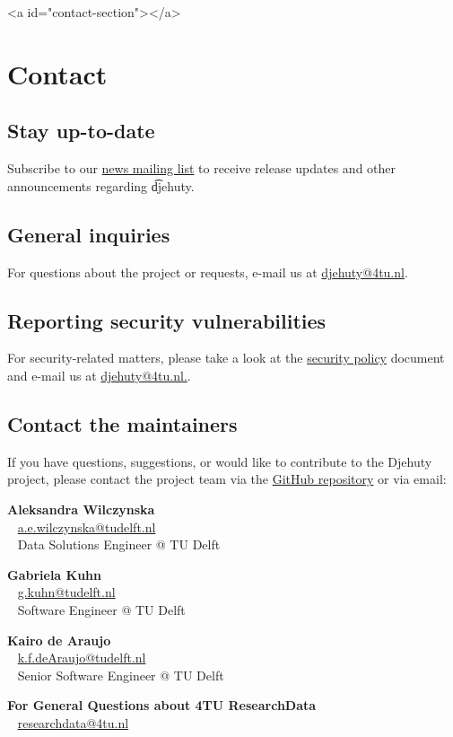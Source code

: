 \ifdefined\HCode
\begin{html}
<a id="contact-section"></a>
\end{html}
\fi
\chapter*{Contact}

\section*{Stay up-to-date}

  Subscribe to our \href{https://djehuty.4tu.nl/postorius/lists/news.djehuty.4tu.nl/}%
  {news mailing list} to receive release updates and other
  announcements regarding \t{djehuty}.

\section*{General inquiries}

  For questions about the project or requests,
  e-mail us at \href{mailto:djehuty@4tu.nl}{djehuty@4tu.nl}.

\section*{Reporting security vulnerabilities}

  For security-related matters, please take a look at the
  \href{https://github.com/4TUResearchData/djehuty?tab=security-ov-file#readme}{security policy}
  document and e-mail us at \href{mailto:djehuty@4tu.nl.}{djehuty@4tu.nl.}.

\section*{Contact the maintainers}

  If you have questions, suggestions, or would like to contribute to the Djehuty project,
  please contact the project team via the
  \href{https://github.com/4TUResearchData/djehuty}{GitHub repository}
  or via email:

\textbf{Aleksandra Wilczynska}\\~
\href{mailto:a.e.wilczynska@tudelft.nl}{a.e.wilczynska@tudelft.nl}\\~
Data Solutions Engineer @ TU Delft

\textbf{Gabriela Kuhn}\\~
\href{mailto:g.kuhn@tudelft.nl}{g.kuhn@tudelft.nl}\\~
Software Engineer @ TU Delft

\textbf{Kairo de Araujo}\\~
\href{mailto:k.f.deAraujo@tudelft.nl}{k.f.deAraujo@tudelft.nl}\\~
Senior Software Engineer @ TU Delft

\textbf{For General Questions about 4TU ResearchData}\\~
\href{mailto:researchdata@4tu.nl}{researchdata@4tu.nl}

